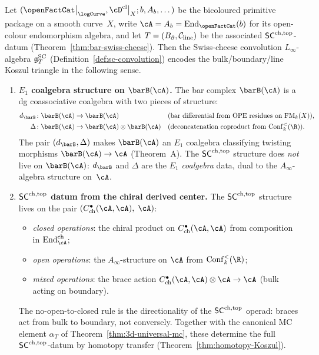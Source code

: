 \begin{theorem}
\label{thm:steinberg-presentation-extended}
Let $(\openFactCat\big|_{\logCurve}, \cD^{\mathrm{cl}}\big|_X; b, A_b, \dots)$
be the bicoloured primitive package on a smooth curve~$X$, write
$\cA = A_b = \mathrm{End}_{\openFactCat}(b)$ for its
open-colour endomorphism algebra, and let
$T = (B_{\partial}, \mathcal C_{\mathrm{line}})$ be the associated
$\mathsf{SC}^{\mathrm{ch,top}}$-datum
\textup{(}Theorem~\textup{\ref{thm:bar-swiss-cheese}}\textup{)}.
Then the Swiss-cheese convolution $L_\infty$-algebra $\mathfrak{g}^{\mathrm{SC}}_T$
\textup{(}Definition~\textup{\ref{def:sc-convolution}}\textup{)}
encodes the bulk/boundary/line Koszul triangle in the
following sense.
\begin{enumerate}[label=\textup{(\roman*)}]
\item \textbf{$E_1$ coalgebra structure on $\barB(\cA)$.}
 The bar complex $\barB(\cA)$ is a dg coassociative coalgebra
 with two pieces of structure:
 \begin{align*}
 d_{\barB}\colon \barB(\cA) &\to \barB(\cA)
 &&\text{\textup{(}bar differential from OPE residues
 on $\FM_k(X)$\textup{)}},\\
 \Delta\colon \barB(\cA) &\to
 \barB(\cA)\otimes\barB(\cA)
 &&\text{\textup{(}deconcatenation coproduct from
 $\Conf_k^{<}(\R)$\textup{)}}.
 \end{align*}
 The pair $(d_{\barB},\Delta)$ makes $\barB(\cA)$ an $E_1$
 coalgebra classifying twisting morphisms
 $\barB(\cA)\to\cA$
 \textup{(}Theorem~\textup{A}\textup{)}.
 The $\mathsf{SC}^{\mathrm{ch,top}}$ structure does \emph{not} live on $\barB(\cA)$:
 $d_{\barB}$ and $\Delta$ are the $E_1$ \emph{coalgebra} data,
 dual to the $A_\infty$-algebra structure on~$\cA$.

\item \textbf{$\mathsf{SC}^{\mathrm{ch,top}}$ datum from the chiral derived center.}
 The $\mathsf{SC}^{\mathrm{ch,top}}$ structure lives on the pair
 $(C^\bullet_{\mathrm{ch}}(\cA,\cA),\;\cA)$:
 \begin{itemize}[leftmargin=1.5em]
 \item \emph{closed operations}: the chiral product on
 $C^\bullet_{\mathrm{ch}}(\cA,\cA)$ from composition in
 $\mathrm{End}^{\mathrm{ch}}_{\cA}$;
 \item \emph{open operations}: the $A_\infty$-structure on
 $\cA$ from $\Conf_k^{<}(\R)$;
 \item \emph{mixed operations}: the brace action
 $C^\bullet_{\mathrm{ch}}(\cA,\cA)\otimes\cA\to\cA$
 (bulk acting on boundary).
 \end{itemize}
 The no-open-to-closed rule is the directionality of the
 $\mathsf{SC}^{\mathrm{ch,top}}$ operad: braces act from bulk to boundary, not
 conversely. Together with the canonical MC element $\alpha_T$
 of Theorem~\textup{\ref{thm:3d-universal-mc}}, these determine
 the full $\mathsf{SC}^{\mathrm{ch,top}}$-datum by homotopy transfer
 \textup{(}Theorem~\textup{\ref{thm:homotopy-Koszul}}\textup{)}.


\end{enumerate}
\end{theorem}
